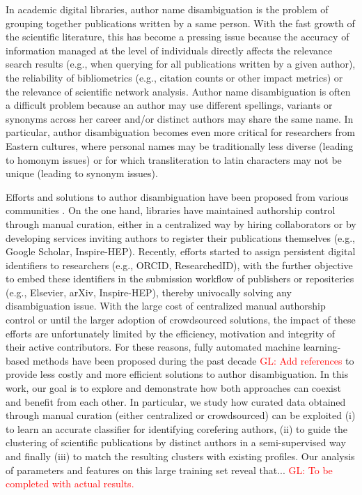 \documentclass{article}
\newcommand{\glnote}[1]{\textcolor{red}{GL: #1}}
\begin{document}
In academic digital libraries, author name disambiguation is the problem of
grouping together publications written by a same person.  With the fast growth
of the scientific literature, this has become a pressing issue because the
accuracy of information managed at the level of individuals directly affects
the relevance search results (e.g., when querying for all publications written
by a given author), the reliability of bibliometrics (e.g., citation counts or
other impact metrics) or the relevance of scientific network analysis. Author
name disambiguation is often a difficult problem because an author may use
different spellings, variants or synonyms across her career and/or distinct
authors may share the same name. In particular, author disambiguation becomes
even more critical for researchers from Eastern cultures, where personal names
may be traditionally less diverse (leading to homonym issues) or for which
transliteration to latin characters may not be unique (leading to synonym
issues).

Efforts and solutions to author disambiguation have been proposed from various
communities \citep{liu2014author}. On the one hand, libraries have maintained
authorship control through manual curation, either in a centralized way by
hiring collaborators or by developing services inviting authors to register
their publications themselves (e.g., Google Scholar, Inspire-HEP). Recently,
efforts started to assign persistent digital identifiers to researchers (e.g.,
ORCID, ResearchedID), with the further objective to embed these identifiers in
the submission workflow of publishers or repositeries (e.g., Elsevier, arXiv,
Inspire-HEP), thereby univocally solving any disambiguation issue. With the
large cost of centralized manual authorship control or until the larger
adoption of crowdsourced solutions, the impact of these efforts are
unfortunately limited by the efficiency, motivation and integrity of their
active contributors. For these reasons, fully automated machine learning-based
methods have been proposed during the past decade \glnote{Add references} to provide less costly and
more efficient solutions to author disambiguation. In this work, our goal is to
explore and demonstrate how both approaches can coexist and benefit from each
other.  In particular, we study how curated data obtained through manual
curation (either centralized or crowdsourced) can be exploited (i) to learn an
accurate classifier for identifying corefering authors, (ii) to guide the
clustering of scientific publications by distinct authors in a semi-supervised
way and finally (iii) to match the resulting clusters with existing profiles.
Our analysis of parameters and features on this large training set reveal
that... \glnote{To be completed with actual results.}
\end{document}
